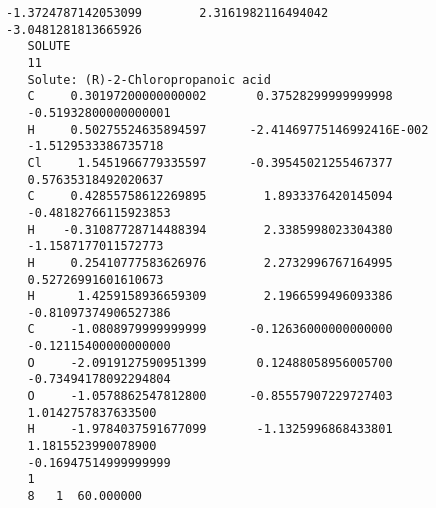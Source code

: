 \begin{lstlisting}[caption=Example of a correct box-file]
   -1.3724787142053099        2.3161982116494042       -3.0481281813665926     
   SOLUTE
   11
   Solute: (R)-2-Chloropropanoic acid
   C     0.30197200000000002       0.37528299999999998      
   -0.51932800000000001     
   H     0.50275524635894597      -2.41469775146992416E-002  
   -1.5129533386735718     
   Cl     1.5451966779335597      -0.39545021255467377       
   0.57635318492020637     
   C     0.42855758612269895        1.8933376420145094      
   -0.48182766115923853     
   H    -0.31087728714488394        2.3385998023304380       
   -1.1587177011572773     
   H     0.25410777583626976        2.2732996767164995       
   0.52726991601610673     
   H      1.4259158936659309        2.1966599496093386      
   -0.81097374906527386     
   C     -1.0808979999999999      -0.12636000000000000      
   -0.12115400000000000     
   O     -2.0919127590951399       0.12488058956005700      
   -0.73494178092294804     
   O     -1.0578862547812800      -0.85557907229727403        
   1.0142757837633500     
   H     -1.9784037591677099       -1.1325996868433801        
   1.1815523990078900     
   -0.16947514999999999     
   1
   8   1  60.000000

\end{lstlisting}